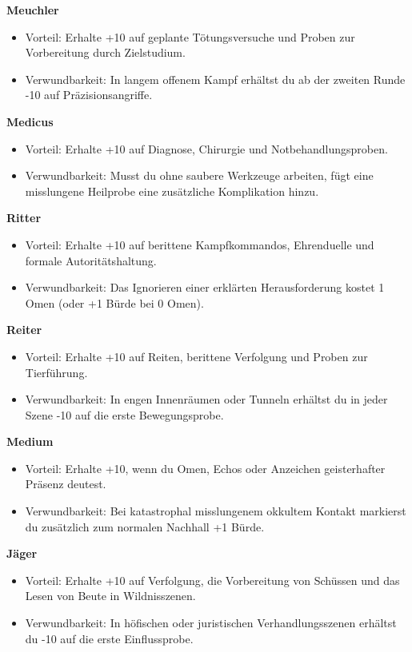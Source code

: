 \noindent\textbf{Meuchler}\par
\begin{itemize}[leftmargin=*,nosep]
\item Vorteil: Erhalte +10 auf geplante Tötungsversuche und Proben zur Vorbereitung durch Zielstudium.
\item Verwundbarkeit: In langem offenem Kampf erhältst du ab der zweiten Runde -10 auf Präzisionsangriffe.
\end{itemize}
\noindent\textbf{Medicus}\par
\begin{itemize}[leftmargin=*,nosep]
\item Vorteil: Erhalte +10 auf Diagnose, Chirurgie und Notbehandlungsproben.
\item Verwundbarkeit: Musst du ohne saubere Werkzeuge arbeiten, fügt eine misslungene Heilprobe eine zusätzliche Komplikation hinzu.
\end{itemize}
\noindent\textbf{Ritter}\par
\begin{itemize}[leftmargin=*,nosep]
\item Vorteil: Erhalte +10 auf berittene Kampfkommandos, Ehrenduelle und formale Autoritätshaltung.
\item Verwundbarkeit: Das Ignorieren einer erklärten Herausforderung kostet 1 Omen (oder +1 Bürde bei 0 Omen).
\end{itemize}
\noindent\textbf{Reiter}\par
\begin{itemize}[leftmargin=*,nosep]
\item Vorteil: Erhalte +10 auf Reiten, berittene Verfolgung und Proben zur Tierführung.
\item Verwundbarkeit: In engen Innenräumen oder Tunneln erhältst du in jeder Szene -10 auf die erste Bewegungsprobe.
\end{itemize}
\noindent\textbf{Medium}\par
\begin{itemize}[leftmargin=*,nosep]
\item Vorteil: Erhalte +10, wenn du Omen, Echos oder Anzeichen geisterhafter Präsenz deutest.
\item Verwundbarkeit: Bei katastrophal misslungenem okkultem Kontakt markierst du zusätzlich zum normalen Nachhall +1 Bürde.
\end{itemize}
\noindent\textbf{Jäger}\par
\begin{itemize}[leftmargin=*,nosep]
\item Vorteil: Erhalte +10 auf Verfolgung, die Vorbereitung von Schüssen und das Lesen von Beute in Wildnisszenen.
\item Verwundbarkeit: In höfischen oder juristischen Verhandlungsszenen erhältst du -10 auf die erste Einflussprobe.
\end{itemize}
